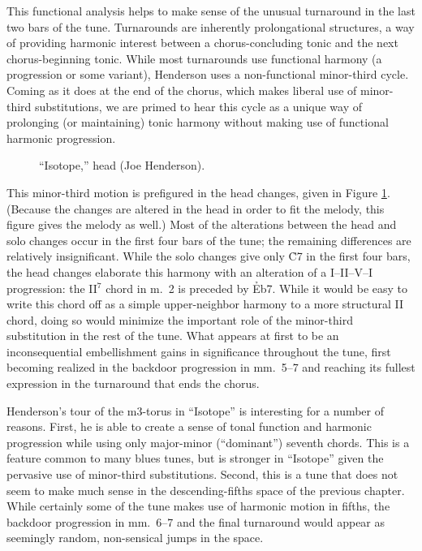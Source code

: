 This functional analysis helps to make sense of the unusual turnaround in the
last two bars of the tune. Turnarounds are inherently prolongational
structures, a way of providing harmonic interest between a chorus-concluding
tonic and the next chorus-beginning tonic. While most turnarounds
use functional harmony (a \tfo progression or some variant), Henderson uses a
non-functional minor-third cycle. Coming as it does at the end of the chorus,
which makes liberal use of minor-third substitutions, we are primed to hear
this cycle as a unique way of prolonging (or maintaining) tonic harmony
without making use of functional harmonic progression.

\begin{figure}[tbp]
  \caption{``Isotope,'' head (Joe Henderson).}
  \label{mts:isotope-head}
\end{figure}

This minor-third motion is prefigured in the head changes, given in Figure
\ref{mts:isotope-head}. (Because the changes are altered in the head in order
to fit the melody, this figure gives the melody as well.) Most of the
alterations between the head and solo changes occur in the first four bars of
the tune; the remaining differences are relatively insignificant.
While the solo changes give only \h{C7} in the first four bars, the head
changes elaborate this harmony with an alteration of a I--II--V--I
progression: the II$^7$ chord in m.~2 is preceded by \h{Eb7}. While it would
be easy to write this chord off as a simple upper-neighbor harmony to a more
structural II chord, doing so would minimize the important role of the
minor-third substitution in the rest of the tune. What appears at first to be
an inconsequential embellishment gains in significance throughout the tune,
first becoming realized in the backdoor progression in mm.~5--7 and reaching
its fullest expression in the turnaround that ends the chorus.


Henderson's tour of the m3-torus in ``Isotope'' is interesting for a number of
reasons. First, he is able to create a sense of tonal function and harmonic
progression while using only major-minor (``dominant'') seventh chords. This
is a feature common to many blues tunes, but is stronger in ``Isotope'' given
the pervasive use of minor-third substitutions. Second, this is a tune that
does not seem to make much sense in the descending-fifths \tf space of the
previous chapter. While certainly some of the tune makes use of harmonic
motion in fifths, the backdoor progression in mm.~6--7 and the final
turnaround would appear as seemingly random, non-sensical jumps in the space.


